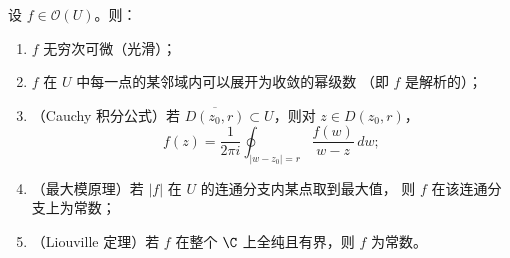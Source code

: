 \begin{theorem}[全纯函数的基本性质]
\label{thm:holomorphic-properties}
设 $f \in \mathcal{O}(U)$。则：
\begin{enumerate}
  \item $f$ 无穷次可微（光滑）；
  \item $f$ 在 $U$ 中每一点的某邻域内可以展开为收敛的幂级数
    （即 $f$ 是解析的）；
  \item （Cauchy 积分公式）若 $\overline{D(z_0, r)} \subset U$，则对
    $z \in D(z_0, r)$，
    \[
      f(z) = \frac{1}{2\pi i} \oint_{|w - z_0| = r}
      \frac{f(w)}{w - z}\, dw;
    \]
  \item （最大模原理）若 $|f|$ 在 $U$ 的连通分支内某点取到最大值，
    则 $f$ 在该连通分支上为常数；
  \item （Liouville 定理）若 $f$ 在整个 $\C$ 上全纯且有界，则 $f$ 为常数。
\end{enumerate}
\end{theorem}

